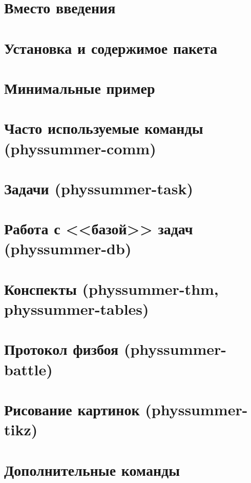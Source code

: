



\section*{Вместо введения}



\section{Установка и содержимое пакета}



\section{Минимальные пример}



\section{Часто используемые команды (physsummer-comm)}




\section{Задачи (physsummer-task)}



\section{Работа с <<базой>> задач (physsummer-db)}



\section{Конспекты (physsummer-thm, physsummer-tables)}



\section{Протокол физбоя (physsummer-battle)}



\section{Рисование картинок (physsummer-tikz)}



\section{Дополнительные команды}





